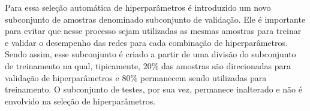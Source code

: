 Para essa seleção automática de hiperparâmetros é introduzido um novo subconjunto de amostras denominado subconjunto de validação.
Ele é importante para evitar que nesse processo sejam utilizadas as mesmas amostras para treinar e validar o desempenho das redes para cada combinação de hiperparâmetros.
Sendo assim, esse subconjunto é criado a partir de uma divisão do subconjunto de treinamento na qual, tipicamente, 20\% das amostras são direcionadas para validação de hiperparâmetros e 80\% permanecem sendo utilizadas para treinamento.
O subconjunto de testes, por sua vez, permanece inalterado e não é envolvido na seleção de hiperparâmetros.



